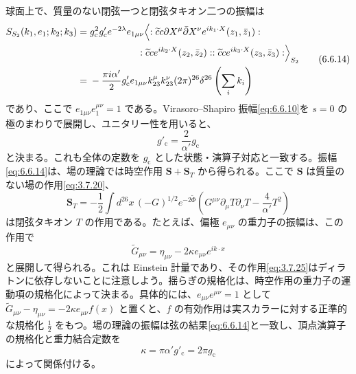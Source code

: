 球面上で、質量のない閉弦一つと閉弦タキオン二つの振幅は
\begin{equation}
\begin{aligned}
S_{S_2}(k_1,e_1;k_2;k_3)
={}&g_{\mathrm c}^2g'_{\mathrm c}e^{-2\lambda}e_{1\mu\nu}
\Bigl\langle:\widetilde c c\partial X^\mu\bar\partial X^\nu
e^{ik_1\cdot X}(z_1,\bar z_1):\\
&\hspace{5em}:\widetilde c c e^{ik_2\cdot X}(z_2,\bar z_2):
:\widetilde c c e^{ik_3\cdot X}(z_3,\bar z_3):\Bigr\rangle_{S_2}\\
={}&-\frac{\pi i\alpha'}2g'_{\mathrm c}
e_{1\mu\nu}k_{23}^\mu k_{23}^\nu
(2\pi)^{26}\delta^{26}\left(\sum_i k_i\right)
\end{aligned}
\tag{6.6.14}\label{eq:6.6.14}
\end{equation}
であり、ここで $e_{1\mu\nu}e_1^{\mu\nu}=1$ である。Virasoro--Shapiro 振幅\eqref{eq:6.6.10}を $s=0$ の極のまわりで展開し、ユニタリー性を用いると、
\begin{equation}
g'_{\mathrm c}=\frac2{\alpha'}g_{\mathrm c}
\tag{6.6.15}\label{eq:6.6.15}
\end{equation}
と決まる。これも全体の定数を $g_{\mathrm c}$ とした状態・演算子対応と一致する。振幅\eqref{eq:6.6.14}は、場の理論では時空作用 $\boldsymbol S+\boldsymbol S_T$ から得られる。ここで $\boldsymbol S$ は質量のない場の作用\eqref{eq:3.7.20}、
\begin{equation}
\boldsymbol S_T=-\frac12\int d^{26}x\,(-G)^{1/2}e^{-2\widetilde\Phi}
\left(G^{\mu\nu}\partial_\mu T\partial_\nu T-\frac4{\alpha'}T^2\right)
\tag{6.6.16}\label{eq:6.6.16}
\end{equation}
は閉弦タキオン $T$ の作用である。たとえば、偏極 $e_{\mu\nu}$ の重力子の振幅は、この作用で
\begin{equation}
\widetilde G_{\mu\nu}=\eta_{\mu\nu}-2\kappa e_{\mu\nu}e^{ik\cdot x}
\tag{6.6.17}\label{eq:6.6.17}
\end{equation}
と展開して得られる。これは Einstein 計量であり、その作用\eqref{eq:3.7.25}はディラトンに依存しないことに注意しよう。揺らぎの規格化は、時空作用の重力子の運動項の規格化によって決まる。具体的には、$e_{\mu\nu}e^{\mu\nu}=1$ として
$\widetilde G_{\mu\nu}-\eta_{\mu\nu}=-2\kappa e_{\mu\nu}f(x)$
と置くと、$f$ の有効作用は実スカラーに対する正準的な規格化 $\tfrac12$ をもつ。場の理論の振幅は弦の結果\eqref{eq:6.6.14}と一致し、頂点演算子の規格化と重力結合定数を
\begin{equation}
\kappa=\pi\alpha'g'_{\mathrm c}=2\pi g_{\mathrm c}
\tag{6.6.18}\label{eq:6.6.18}
\end{equation}
によって関係付ける。

